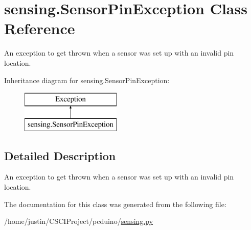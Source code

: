 \hypertarget{classsensing_1_1_sensor_pin_exception}{\section{sensing.\-Sensor\-Pin\-Exception Class Reference}
\label{classsensing_1_1_sensor_pin_exception}
}


An exception to get thrown when a sensor was set up with an invalid pin location.  


Inheritance diagram for sensing.\-Sensor\-Pin\-Exception\-:\begin{figure}[H]
\begin{center}
\leavevmode
\includegraphics[height=2.000000cm]{classsensing_1_1_sensor_pin_exception}
\end{center}
\end{figure}


\subsection{Detailed Description}
An exception to get thrown when a sensor was set up with an invalid pin location. 

The documentation for this class was generated from the following file\-:\begin{DoxyCompactItemize}
\item 
/home/justin/\-C\-S\-C\-I\-Project/pcduino/\hyperlink{sensing_8py}{sensing.\-py}\end{DoxyCompactItemize}
